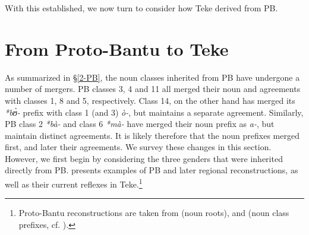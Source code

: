 \documentclass[output=paper,,modfonts,nonflat]{langsci/langscibook}
\begin{document}

With this established, we now turn to consider how Teke derived from PB.


\section{From Proto-Bantu to Teke} 
\label{4-PB-Teke}

As summarized in \S\ref{2-PB}, the noun classes inherited from PB have undergone a number of mergers. PB classes 3, 4 and 11 all merged their noun and agreements with classes 1, 8 and 5, respectively. Class 14, on the other hand has merged its \textit{*bʊ̀-} prefix with class 1 (and 3) \textit{ò-}, but maintains a separate agreement. Similarly, PB class 2 \textit{*bà-} and class 6 \textit{*mà-} have merged their noun prefix as \textit{a-}, but maintain distinct agreements. It is likely therefore that the noun prefixes merged first, and later their agreements. We survey these changes in this section. However, we first begin by considering the three genders that were inherited directly from PB.  presents examples of PB and later regional reconstructions, as well as their current reflexes in Teke.\footnote{Proto-Bantu reconstructions are taken from \citet{Bastinetal2002} (noun roots), and \citet{Meeussen1967} (noun class prefixes, cf. ).}
\end{document}
